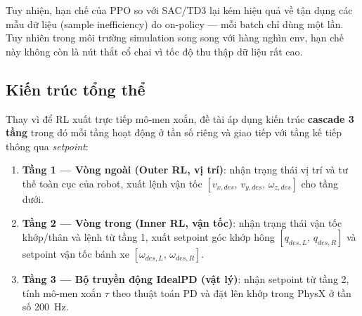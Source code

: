 Tuy nhiện, hạn chế của PPO so với SAC/TD3 lại kém hiệu quả về tận dụng các mẫu dữ liệu
(sample inefficiency) do on-policy — mỗi batch chỉ dùng một lần. Tuy
nhiên trong môi trường simulation song song với hàng nghìn env, hạn chế
này không còn là nút thắt cổ chai vì tốc độ thu thập dữ liệu rất cao.

\subsection{Kiến trúc tổng thể}
\label{sec:cascade_arch}

Thay vì để RL xuất trực tiếp mô-men xoắn, đề tài áp dụng kiến trúc
\textbf{cascade 3 tầng} trong đó mỗi tầng hoạt động ở tần số riêng và
giao tiếp với tầng kế tiếp thông qua \textit{setpoint}:

\begin{enumerate}
    \item \textbf{Tầng 1 — Vòng ngoài (Outer RL, vị trí)}: nhận trạng thái
    vị trí và tư thế toàn cục của robot, xuất lệnh vận tốc
    $[v_{x,des},\,v_{y,des},\,\omega_{z,des}]$ cho tầng dưới.

    \item \textbf{Tầng 2 — Vòng trong (Inner RL, vận tốc)}: nhận trạng thái
    vận tốc khớp/thân và lệnh từ tầng 1, xuất setpoint góc khớp hông
    $[q_{des,L},\,q_{des,R}]$ và setpoint vận tốc bánh xe
    $[\omega_{des,L},\,\omega_{des,R}]$.

    \item \textbf{Tầng 3 — Bộ truyền động IdealPD (vật lý)}: nhận setpoint từ
    tầng 2, tính mô-men xoắn $\tau$ theo thuật toán PD và đặt lên khớp trong PhysX
    ở tần số 200~Hz.
\end{enumerate}

